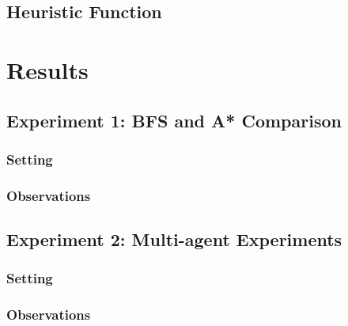 \documentclass[11pt]{article}
\begin{document}
\subsection{Heuristic Function}


\section{Results}

\subsection{Experiment 1: BFS and A* Comparison}

\subsubsection{Setting}

\subsubsection{Observations}


\subsection{Experiment 2: Multi-agent Experiments}

\subsubsection{Setting}

\subsubsection{Observations}
\end{document}
